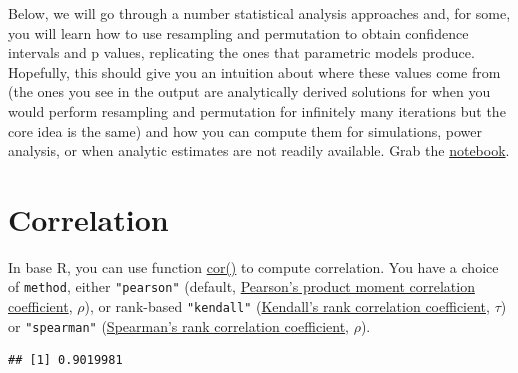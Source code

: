 \documentclass[
]{book}
\newenvironment{Shaded}{\begin{snugshade}}{\end{snugshade}}
\newcommand{\AttributeTok}[1]{\textcolor[rgb]{0.77,0.63,0.00}{#1}}
\newcommand{\DecValTok}[1]{\textcolor[rgb]{0.00,0.00,0.81}{#1}}
\newcommand{\FloatTok}[1]{\textcolor[rgb]{0.00,0.00,0.81}{#1}}
\newcommand{\FunctionTok}[1]{\textcolor[rgb]{0.00,0.00,0.00}{#1}}
\newcommand{\NormalTok}[1]{#1}
\newcommand{\OtherTok}[1]{\textcolor[rgb]{0.56,0.35,0.01}{#1}}
\newcommand{\SpecialCharTok}[1]{\textcolor[rgb]{0.00,0.00,0.00}{#1}}
\newcommand{\StringTok}[1]{\textcolor[rgb]{0.31,0.60,0.02}{#1}}
\begin{document}
Below, we will go through a number statistical analysis approaches and, for some, you will learn how to use resampling and permutation to obtain confidence intervals and p values, replicating the ones that parametric models produce. Hopefully, this should give you an intuition about where these values come from (the ones you see in the output are analytically derived solutions for when you would perform resampling and permutation for infinitely many iterations but the core idea is the same) and how you can compute them for simulations, power analysis, or when analytic estimates are not readily available. Grab the \href{notebooks/Seminar\%2014\%20-\%20statistics.Rmd}{notebook}.

\hypertarget{correlation}{%
\section{Correlation}\label{correlation}}

In base R, you can use function \href{https://stat.ethz.ch/R-manual/R-devel/library/stats/html/cor.html}{cor()} to compute correlation. You have a choice of \texttt{method}, either \texttt{"pearson"} (default, \href{https://en.wikipedia.org/wiki/Pearson_correlation_coefficient}{Pearson's product moment correlation coefficient}, \(\rho\)), or rank-based \texttt{"kendall"} (\href{https://en.wikipedia.org/wiki/Kendall_rank_correlation_coefficient}{Kendall's rank correlation coefficient}, \(\tau\)) or \texttt{"spearman"} (\href{https://en.wikipedia.org/wiki/Spearman\%27s_rank_correlation_coefficient}{Spearman's rank correlation coefficient}, \(\rho\)).

\begin{Shaded}
\end{Shaded}

\begin{verbatim}
## [1] 0.9019981
\end{verbatim}
\end{document}
